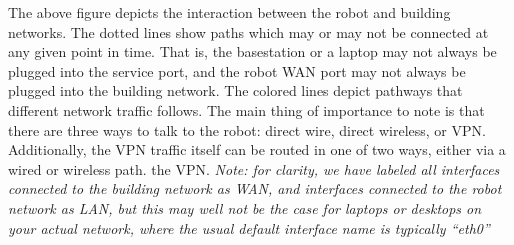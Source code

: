 The above figure depicts the interaction between the robot and
building networks.  The dotted lines show paths which may or may not
be connected at any given point in time.  That is, the basestation or
a laptop may not always be plugged into the service port, and the
robot WAN port may not always be plugged into the building network.
The colored lines depict pathways that different network traffic
follows.  The main thing of importance to note is that there are three
ways to talk to the robot: direct wire, direct wireless, or VPN.
Additionally, the VPN traffic itself can be routed in one of two ways,
either via a wired or wireless path.
the VPN.  \textit{Note: for clarity, we have labeled all interfaces
  connected to the building network as WAN, and interfaces connected
  to the robot network as LAN, but this may well not be the case for
  laptops or desktops on your actual network, where the usual default
  interface name is typically ``eth0''}

